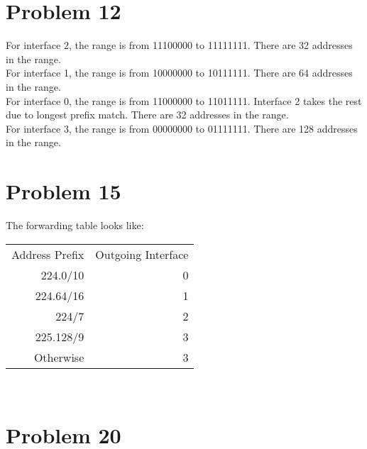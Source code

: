 \documentclass[titlepage, paper=a4, fontsize=11pt]{scrartcl} %
\numberwithin{equation}{section} %
\numberwithin{table}{section} %
\begin{document}

\section*{Problem 12}
For interface 2, the range is from 11100000 to 11111111. There are 32 addresses in the range. \\
For interface 1, the range is from 10000000 to 10111111. There are 64 addresses in the range. \\
For interface 0, the range is from 11000000 to 11011111. Interface 2 takes the rest due to longest prefix match. There are 32 addresses in the range. \\
For interface 3, the range is from 00000000 to 01111111. There are 128 addresses in the range. \\





\section*{Problem 15}
The forwarding table looks like: \\
\begin{tabular}{ r | r  }
  Address Prefix & Outgoing Interface \\
  224.0/10 & 0 \\
  224.64/16 & 1 \\
  224/7 & 2 \\
  225.128/9 & 3 \\
  Otherwise & 3 \\
\end{tabular}
\\




\section*{Problem 20}
\end{document}
